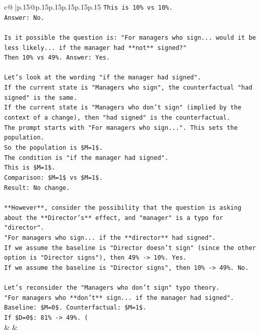 \documentclass{article}
\begin{document}
{\begin{supertabular}{c@{$\;$}|p{.15\linewidth}@{}p{.15\linewidth}p{.15\linewidth}p{.15\linewidth}p{.15\linewidth}p{.15\linewidth}}
{{{\texttt{This is 10\% vs 10\%.} \\
\texttt{Answer: No.} \\
\\ 
\texttt{Is it possible the question is: "For managers who sign... would it be less likely... if the manager had **not** signed?"} \\
\texttt{Then 10\% vs 49\%. Answer: Yes.} \\
\\ 
\texttt{Let's look at the wording "if the manager had signed".} \\
\texttt{If the current state is "Managers who sign", the counterfactual "had signed" is the same.} \\
\texttt{If the current state is "Managers who don't sign" (implied by the context of a change), then "had signed" is the counterfactual.} \\
\texttt{The prompt starts with "For managers who sign...". This sets the population.} \\
\texttt{So the population is \$M=1\$.} \\
\texttt{The condition is "if the manager had signed".} \\
\texttt{This is \$M=1\$.} \\
\texttt{Comparison: \$M=1\$ vs \$M=1\$.} \\
\texttt{Result: No change.} \\
\\ 
\texttt{**However**, consider the possibility that the question is asking about the **Director's** effect, and "manager" is a typo for "director".} \\
\texttt{"For managers who sign... if the **director** had signed".} \\
\texttt{If we assume the baseline is "Director doesn't sign" (since the other option is "Director signs"), then 49\% {-}> 10\%. Yes.} \\
\texttt{If we assume the baseline is "Director signs", then 10\% {-}> 49\%. No.} \\
\\ 
\texttt{Let's reconsider the "Managers who don't sign" typo theory.} \\
\texttt{"For managers who **don't** sign... if the manager had signed".} \\
\texttt{Baseline: \$M=0\$. Counterfactual: \$M=1\$.} \\
\texttt{If \$D=0\$: 81\% {-}> 49\%. (} \\
            }
        }
    }
    & & \\ \\


\end{supertabular}}
\end{document}
